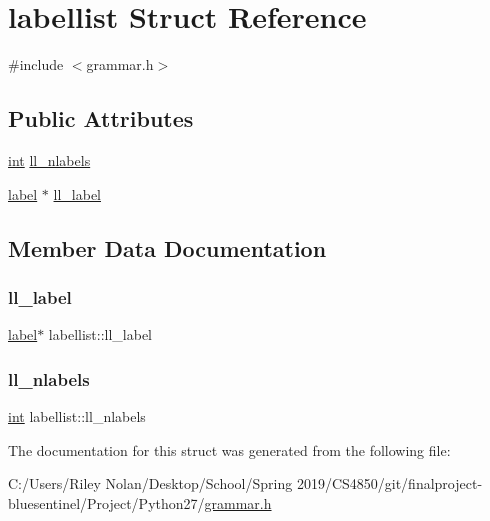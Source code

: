 \hypertarget{structlabellist}{}\section{labellist Struct Reference}
\label{structlabellist}


{\ttfamily \#include $<$grammar.\+h$>$}

\subsection*{Public Attributes}
\begin{DoxyCompactItemize}
\item 
\mbox{\hyperlink{warnings_8h_a74f207b5aa4ba51c3a2ad59b219a423b}{int}} \mbox{\hyperlink{structlabellist_a5db03d4e55f346dbc9d94dce8ae0733e}{ll\+\_\+nlabels}}
\item 
\mbox{\hyperlink{structlabel}{label}} $\ast$ \mbox{\hyperlink{structlabellist_a24e33547b17e39e8a3d072ea498bffcd}{ll\+\_\+label}}
\end{DoxyCompactItemize}


\subsection{Member Data Documentation}
\mbox{\label{structlabellist_a24e33547b17e39e8a3d072ea498bffcd}} 
\subsubsection{\texorpdfstring{ll\_label}{ll\_label}}
{\footnotesize\ttfamily \mbox{\hyperlink{structlabel}{label}}$\ast$ labellist\+::ll\+\_\+label}

\mbox{\label{structlabellist_a5db03d4e55f346dbc9d94dce8ae0733e}} 
\subsubsection{\texorpdfstring{ll\_nlabels}{ll\_nlabels}}
{\footnotesize\ttfamily \mbox{\hyperlink{warnings_8h_a74f207b5aa4ba51c3a2ad59b219a423b}{int}} labellist\+::ll\+\_\+nlabels}



The documentation for this struct was generated from the following file\+:\begin{DoxyCompactItemize}
\item 
C\+:/\+Users/\+Riley Nolan/\+Desktop/\+School/\+Spring 2019/\+C\+S4850/git/finalproject-\/bluesentinel/\+Project/\+Python27/\mbox{\hyperlink{grammar_8h}{grammar.\+h}}\end{DoxyCompactItemize}
